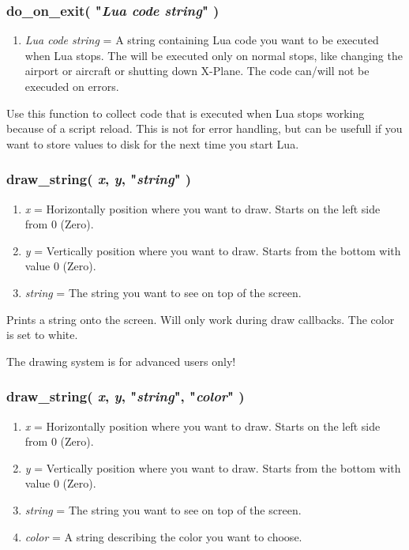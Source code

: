 \documentclass[11pt,parskip=half,a4paper]{scrartcl}
\begin{document}
\subsubsection{do\_on\_exit( "\emph{Lua code string}" )}

\begin{enumerate}
	\item \emph{Lua code string} = A string containing Lua code you want to be executed when Lua stops. The will be executed only on normal stops, like changing the airport or aircraft or shutting down X-Plane. The code can/will not be execuded on errors.
\end{enumerate}

Use this function to collect code that is executed when Lua stops working because of a script reload. This is not for error handling, but can be usefull if you want to store values to disk for the next time you start Lua.

\subsubsection{draw\_string( \emph{x}, \emph{y}, "\emph{string}" )}

\begin{enumerate}
	\item \emph{x} = Horizontally position where you want to draw. Starts on the left side from 0 (Zero).
	\item \emph{y} = Vertically position where you want to draw. Starts from the bottom with value 0 (Zero).
	\item \emph{string} = The string you want to see on top of the screen.
\end{enumerate}

Prints a string onto the screen. Will only work during draw callbacks. The color is set to white.

The drawing system is for advanced users only!

\subsubsection{draw\_string( \emph{x}, \emph{y}, "\emph{string}",  "\emph{color}" )}

\begin{enumerate}
	\item \emph{x} = Horizontally position where you want to draw. Starts on the left side from 0 (Zero).
	\item \emph{y} = Vertically position where you want to draw. Starts from the bottom with value 0 (Zero).
	\item \emph{string} = The string you want to see on top of the screen.
	\item \emph{color} = A string describing the color you want to choose.
\end{enumerate}
\end{document}
